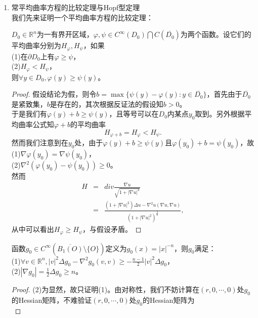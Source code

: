 \begin{enumerate}
\item 常平均曲率方程的比较定理与Hopf型定理\\
我们先来证明一个平均曲率方程的比较定理：
\begin{theorem}
$D_{0}\in\mathbb{R}^{n}$为一有界开区域，$\varphi,\psi\in C^{\infty}(D_{0})\bigcap C(\overline{D_{0}})$为两个函数。设它们的平均曲率分别为$H_{\varphi},H_{\psi}$，如果\\
(1)在$\partial D_{0}$上有$\varphi\geq\psi$，\\
(2)$H_{\varphi}<H_{\psi}$，\\
则$\forall y\in D_{0}, \varphi(y)\geq\psi(y)$。
\end{theorem}
\begin{proof}
假设结论为假，则令$b=\max\{\psi(y)-\varphi(y):y\in\overline{D_{0}}\}$，首先由于$\overline{D_{0}}$是紧致集，$b$是存在的，其次根据反证法的假设知$b>0$。\\
于是我们有$\varphi(y)+b\geq\psi(y)$，且等号可以在$D_{0}$内某点$y_{0}$取到。另外根据平均曲率公式知$\varphi+b$的平均曲率
\begin{displaymath}
H_{\varphi+b}=H_{\varphi}<H_{\psi}.
\end{displaymath}
然而我们注意到在$y_{0}$处，由于$\varphi(y)+b\geq\psi(y)$且$\varphi(y_{0})+b=\psi(y_{0})$，故\\
(1)$\nabla\varphi(y_{0})=\nabla\psi(y_{0})$，\\
(2)$\nabla^{2}(\varphi(y_{0})-\psi(y_{0}))\geq 0$。\\
然而
\begin{eqnarray*}
H&=&div\frac{\nabla u}{\sqrt{1+|\nabla u|^{2}}}\\
&=&\frac{(1+|\nabla u|^{2})\Delta u-\nabla^{2}u(\nabla u,\nabla u)}{(1+|\nabla u|^{2})^{\frac{3}{2}}},
\end{eqnarray*}
从中可以看出$H_{\varphi}\geq H_{\psi}$，与假设矛盾。
\end{proof}
\begin{lemma}
函数$g_{0}\in C^{\infty}(\overline{B_{1}(O)}\setminus\{O\})$定义为$g_{0}(x)=|x|^{-n}$，则$g_{0}$满足：\\
(1)$\forall v\in \mathbb{R}^{n}, |v|^{2}\Delta g_{0}-\nabla^{2}g_{0}(v,v)\geq -\frac{n-1}{2}|v|^{2}\Delta g_{0}$，\\
(2)$|\nabla g_{0}|= \frac{1}{2}\Delta g_{0}\geq n$。
\end{lemma}
\begin{proof}
(2)为显然，故只证明(1)。由对称性，我们不妨计算在$(r,0,\cdots,0)$处$g_{0}$的Hessian矩阵，不难验证$(r,0,\cdots,0)$处$g_{0}$的Hessian矩阵为
\begin{displaymath}

\end{displaymath}
\end{proof}
\end{enumerate}
